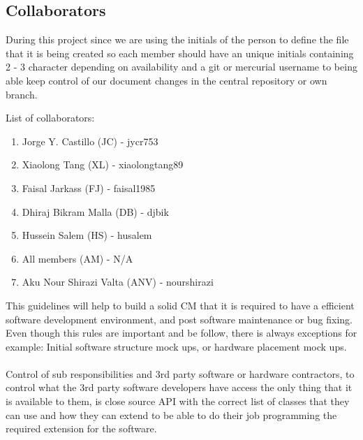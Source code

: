 \subsection*{Collaborators}
During this project since we are using the initials of the person to define the file that it is being created so each member should have an unique initials containing 2 - 3 character depending on availability and a git or mercurial username to being able keep control of our document changes in the central repository or own branch.

List of collaborators:
\begin{enumerate}
	\item Jorge Y. Castillo (JC) - jycr753
	\item Xiaolong Tang (XL) - xiaolongtang89
	\item Faisal Jarkass (FJ) - faisal1985
	\item Dhiraj Bikram Malla (DB) - djbik
	\item Hussein Salem (HS) - husalem
	\item All members (AM) - N/A
	\item Aku Nour Shirazi Valta (ANV) - nourshirazi
\end{enumerate}

This guidelines will help to build a solid CM that it is required to have a efficient software development environment, and post software maintenance or bug fixing. Even though this rules are important and be follow, there is always exceptions for example: Initial software structure mock ups, or hardware placement mock ups.
\\
\\
Control of sub responsibilities and 3rd party software or hardware contractors, to control what the 3rd party software developers have access the only thing that it is available to them, is close source API with the correct list of classes that they can use and how they can extend to be able to do their job programming the required extension for the software.
